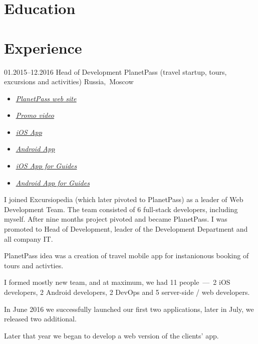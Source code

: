 \documentclass[12pt,a4paper,oneside,final]{moderncv}
\begin{document}
\section{Education}

\section{Experience}
\cventry
{01.2015--12.2016}
{Head of Development}
{
  PlanetPass (travel startup, tours, excursions and activities)
}
{Russia,~Moscow}
{}
{
  \begin{itemize}
    \item \underline{\href{https://planetpass.com}{\itshape PlanetPass web site}}
    \item \underline{\href{https://vimeo.com/176452074}{\itshape Promo video}}
    \item \underline{\href{https://itunes.apple.com/us/app/planetpass-city-walks-with-guides/id1087995218}{\itshape iOS App}}
    \item \underline{\href{https://play.google.com/store/apps/details?id=com.excursiopedia.planetpass}{\itshape Android App}}
    \item \underline{\href{https://itunes.apple.com/us/app/tool-for-guides/id1129160306}{\itshape iOS App for Guides}}
    \item \underline{\href{https://play.google.com/store/apps/details?id=com.excursiopedia.guide}{\itshape Android App for Guides}}
  \end{itemize}
  \smallskip
  {\parindent=0.7cm
    I joined Excursiopedia (which later pivoted to PlanetPass) as a leader of Web Development Team. The team consisted of 6 full-stack developers, including myself. After nine months project pivoted and became PlanetPass. I was promoted to Head of Development, leader of the Development Department and all company IT.

    PlanetPass idea was a creation of travel mobile app for instanionous booking of tours and activties.

    I formed mostly new team, and at maximum, we had 11 people~---~2 iOS developers, 2 Android developers, 2 DevOps and 5 server-side / web developers.

    In June 2016 we successfully launched our first two applications, later in July, we released two additional.

    Later that year we began to develop a web version of the clients' app.
  }
}
\end{document}
